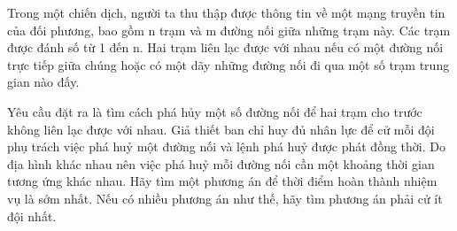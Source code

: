 Trong một chiến dịch, người ta thu thập được thông tin về một mạng truyền tin của đối phương, bao gồm n trạm và m đường nối giữa những trạm   này. Các trạm được đánh số từ 1 đến n. Hai trạm liên lạc được với nhau nếu có một đường nối trực tiếp giữa chúng hoặc có một dãy những đường nối   đi qua một số trạm trung gian nào đấy.  

   Yêu cầu đặt ra là tìm cách phá hủy một số đường nối để hai trạm cho trước không liên lạc được với nhau. Giả thiết ban chỉ huy đủ nhân lực để cử   mỗi đội phụ trách việc phá huỷ một đường nối và lệnh phá huỷ được phát đồng thời. Do địa hình khác nhau nên việc phá huỷ mỗi đường nối cần một   khoảng thời gian tương ứng khác nhau. Hãy tìm một phương án để thời điểm hoàn thành nhiệm vụ là sớm nhất. Nếu có nhiều phương án như thế, hãy tìm   phương án phải cử ít đội nhất.